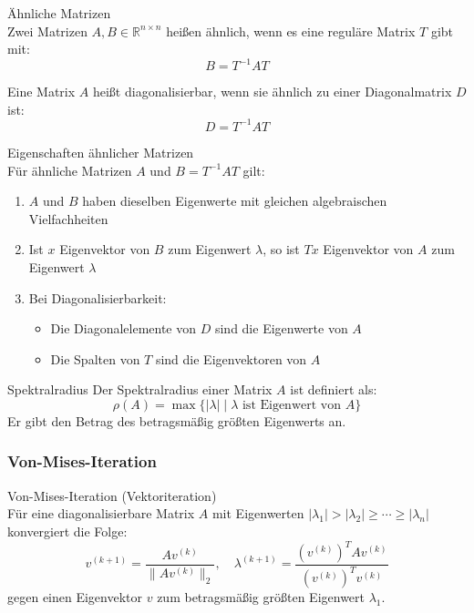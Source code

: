 \begin{concept}{Ähnliche Matrizen}\\
Zwei Matrizen $A,B \in \mathbb{R}^{n\times n}$ heißen ähnlich, wenn es eine reguläre Matrix $T$ gibt mit:
$$B = T^{-1}AT$$

Eine Matrix $A$ heißt diagonalisierbar, wenn sie ähnlich zu einer Diagonalmatrix $D$ ist:
$$D = T^{-1}AT$$
\end{concept}

\begin{theorem}{Eigenschaften ähnlicher Matrizen}\\
Für ähnliche Matrizen $A$ und $B = T^{-1}AT$ gilt:
\begin{enumerate}
    \item $A$ und $B$ haben dieselben Eigenwerte mit gleichen algebraischen Vielfachheiten
    \item Ist $x$ Eigenvektor von $B$ zum Eigenwert $\lambda$, so ist $Tx$ Eigenvektor von $A$ zum Eigenwert $\lambda$
    \item Bei Diagonalisierbarkeit:
    \begin{itemize}
        \item Die Diagonalelemente von $D$ sind die Eigenwerte von $A$
        \item Die Spalten von $T$ sind die Eigenvektoren von $A$
    \end{itemize}
\end{enumerate}
\end{theorem}

\begin{definition}{Spektralradius}
Der Spektralradius einer Matrix $A$ ist definiert als:
$$\rho(A) = \max\{|\lambda| \mid \lambda \text{ ist Eigenwert von } A\}$$
Er gibt den Betrag des betragsmäßig größten Eigenwerts an.
\end{definition}

\subsubsection{Von-Mises-Iteration}

\begin{concept}{Von-Mises-Iteration (Vektoriteration)}\\
Für eine diagonalisierbare Matrix $A$ mit Eigenwerten $|\lambda_1| > |\lambda_2| \geq \cdots \geq |\lambda_n|$ konvergiert die Folge:
$$v^{(k+1)} = \frac{Av^{(k)}}{\|Av^{(k)}\|_2}, \quad
\lambda^{(k+1)} = \frac{(v^{(k)})^TAv^{(k)}}{(v^{(k)})^Tv^{(k)}}$$
gegen einen Eigenvektor $v$ zum betragsmäßig größten Eigenwert $\lambda_1$.
\end{concept}

